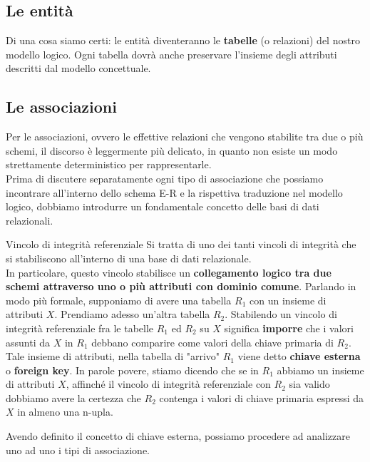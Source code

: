 \documentclass[12pt]{report}
\begin{document}
	\subsection{Le entità}
	Di una cosa siamo certi: le entità diventeranno le \textbf{tabelle} (o relazioni) del nostro modello logico. Ogni tabella dovrà anche preservare l'insieme degli attributi descritti dal modello concettuale.
	
	\subsection{Le associazioni}
	Per le associazioni, ovvero le effettive relazioni che vengono stabilite tra due o più schemi, il discorso è leggermente più delicato, in quanto non esiste un modo strettamente deterministico per rappresentarle.\\
	Prima di discutere separatamente ogni tipo di associazione che possiamo incontrare all'interno dello schema E-R e la rispettiva traduzione nel modello logico, dobbiamo introdurre un fondamentale concetto delle basi di dati relazionali.
	
	\begin{definizione}{Vincolo di integrità referenziale}{}
		Si tratta di uno dei tanti vincoli di integrità che si stabiliscono all'interno di una base di dati relazionale.\\
		In particolare, questo vincolo stabilisce un \textbf{collegamento logico tra due schemi attraverso uno o più attributi con dominio comune}.
		\smallbreak
		Parlando in modo più formale, supponiamo di avere una tabella $R_1$ con un insieme di attributi $X$. Prendiamo adesso un'altra tabella $R_2$.
		Stabilendo un vincolo di integrità referenziale fra le tabelle $R_1$ ed $R_2$ su $X$ significa \textbf{imporre} che i valori assunti da $X$ in $R_1$ debbano comparire come valori della chiave primaria di $R_2$. Tale insieme di attributi, nella tabella di "arrivo" $R_1$ viene detto \textbf{chiave esterna} o \textbf{foreign key}.
		\smallbreak
		In parole povere, stiamo dicendo che se in $R_1$ abbiamo un insieme di attributi $X$, affinché il vincolo di integrità referenziale con $R_2$ sia valido dobbiamo avere la certezza che $R_2$ contenga i valori di chiave primaria espressi da $X$ in almeno una n-upla.
	\end{definizione}
	
	Avendo definito il concetto di chiave esterna, possiamo procedere ad analizzare uno ad uno i tipi di associazione.
	
\end{document}
